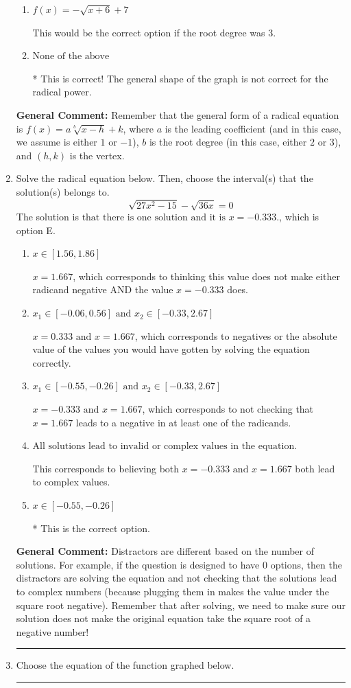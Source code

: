 \documentclass{extbook}[14pt]
\newcommand{\litem}[1]{\item #1

\rule{\textwidth}{0.4pt}}
\begin{document}
\begin{enumerate}
{\begin{enumerate}[label=\Alph*.]
This corresponds to the correct coefficient and switching the $x$-value of the vertex with the root degree as $2$.
\item \( f(x) = - \sqrt{x + 6} + 7 \)

This would be the correct option if the root degree was $3$.
\item \( \text{None of the above} \)

* This is correct! The general shape of the graph is not correct for the radical power.
\end{enumerate}

\textbf{General Comment:} Remember that the general form of a radical equation is $ f(x) = a \sqrt[b]{x - h} + k$, where $a$ is the leading coefficient (and in this case, we assume is either $1$ or $-1$), $b$ is the root degree (in this case, either $2$ or $3$), and $(h, k)$ is the vertex.
}
\litem{
Solve the radical equation below. Then, choose the interval(s) that the solution(s) belongs to.
\[ \sqrt{27 x^2 - 15} - \sqrt{36 x} = 0 \]The solution is \( \text{that there is one solution and it is } x = -0.333. \), which is option E.\begin{enumerate}[label=\Alph*.]
\item \( x \in [1.56,1.86] \)

$x = 1.667$, which corresponds to thinking this value does not make either radicand negative AND the value $x = -0.333$ does.
\item \( x_1 \in [-0.06, 0.56] \text{ and } x_2 \in [-0.33,2.67] \)

$x = 0.333 \text{ and } x = 1.667$, which corresponds to negatives or the absolute value of the values you would have gotten by solving the equation correctly.
\item \( x_1 \in [-0.55, -0.26] \text{ and } x_2 \in [-0.33,2.67] \)

$x = -0.333 \text{ and } x = 1.667$, which corresponds to not checking that $x = 1.667$ leads to a negative in at least one of the radicands.
\item \( \text{All solutions lead to invalid or complex values in the equation.} \)

This corresponds to believing both $x = -0.333 \text{ and } x = 1.667$ both lead to complex values.
\item \( x \in [-0.55,-0.26] \)

* This is the correct option.
\end{enumerate}

\textbf{General Comment:} Distractors are different based on the number of solutions. For example, if the question is designed to have 0 options, then the distractors are solving the equation and not checking that the solutions lead to complex numbers (because plugging them in makes the value under the square root negative). Remember that after solving, we need to make sure our solution does not make the original equation take the square root of a negative number!
}
\litem{
Choose the equation of the function graphed below.

}
\end{enumerate}
\end{document}
